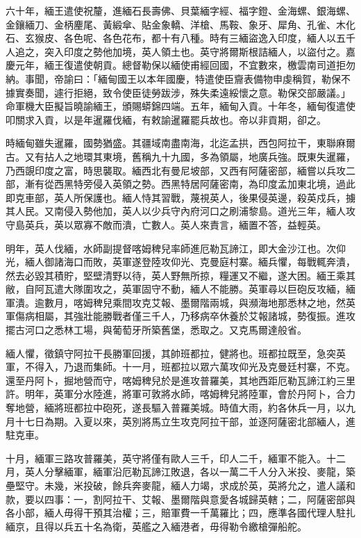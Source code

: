 \begin{pinyinscope}
六十年，緬王遣使祝釐，進緬石長壽佛、貝葉緬字經、福字鐙、金海螺、銀海螺、金鑲緬刀、金柄麈尾、黃緞傘、貼金象轎、洋槍、馬鞍、象牙、犀角、孔雀、木化石、玄猴皮、各色呢、各色花布，都十有八種。時有三緬盜逸入印度，緬人以五千人追之，突入印度之勢他加境，英人領土也。英守將爾斯根詰緬人，以盜付之。嘉慶元年，緬王復遣使朝貢。總督勒保以緬使甫經回國，不宜數來，檄雲南司道拒勿納。事聞，帝諭曰：「緬甸國王以本年國慶，特遣使臣齎表備物申虔稱賀，勒保不據實奏聞，遽行拒絕，致令使臣徒勞跋涉，殊失柔遠綏懷之意。勒保交部嚴議。」命軍機大臣擬旨曉諭緬王，頒賜蟒錦四端。五年，緬甸入貢。十年冬，緬甸復遣使叩關求入貢，以是年暹羅伐緬，有敕諭暹羅罷兵故也。帝以非貢期，卻之。

時緬甸雖失暹羅，國勢猶盛。其疆域南盡南海，北迄孟拱，西包阿拉干，東聯麻爾古。又有拈人之地環其東境，舊稱九十九國，多為領屬，地廣兵強。既東失暹羅，乃西覬印度之富，時思襲取。緬西北有曼尼坡部，又西有阿薩密部，緬嘗以兵攻二部，漸有從西黑特旁侵入英領之勢。西黑特居阿薩密南，為印度孟加東北境，過此即克車部，英人所保護也。緬人恃其習戰，蔑視英人，後果侵英邊，殺英戍兵，擄其人民。又南侵入勢他加，英人以少兵守內府河口之刷浦黎島。道光三年，緬人攻守島英兵，英以眾寡不敵而潰，亡數人。英人來責言，緬置不答，益輕英。

明年，英人伐緬，水師副提督喀姆稗兒率師進厄勒瓦諦江，即大金沙江也。次仰光，緬人御諸海口而敗，英軍遂登陸攻仰光、克曼庭村寨。緬兵懼，每戰輒奔潰，然去必毀其積貯，堅壁清野以待，英人野無所掠，糧運又不繼，遂大困。緬王乘其敝，自阿瓦遣大隊圍攻之，英軍固守不動，緬人不能勝。英軍尋以巨砲反攻緬，緬軍潰。逾數月，喀姆稗兒乘間攻克艾報、墨爾階兩城，與瀕海地那悉林之地，然英軍傷病相屬，其強壯能勝戰者僅三千人，乃移病卒休養於艾報諸城，勢復振。進攻擺古河口之悉林工場，與葡萄牙所築舊堡，悉取之。又克馬爾達般省。

緬人懼，徵鎮守阿拉干長勝軍回援，其帥班都拉，健將也。班都拉既至，急突英軍，不得入，乃退而集師。十一月，班都拉以眾六萬攻仰光及克曼廷村寨，不克。還至丹阿卜，掘地營而守，喀姆稗兒於是進攻普羅美，其地西距厄勒瓦諦江約三里許。明年，英軍分水陸進，將軍可敦將水師，喀姆稗兒將陸軍，會於丹阿卜，合力奪地營，緬將班都拉中砲死，遂長驅入普羅美城。時值大雨，約各休兵一月，以九月十七日為期。入夏以來，英別將馬立生攻克阿拉干部，並逐阿薩密北部緬人，進駐克車。

十月，緬軍三路攻普羅美，英守將僅有歐人三千，印人二千，緬軍不能入。十二月，英人分擊緬軍，緬軍沿厄勒瓦諦江敗退，各以一萬二千人分入米投、麥龍，築壘堅守。未幾，米投破，餘兵奔麥龍，緬人力竭，求成於英，英將允之，遣人議和款，要以四事：一，割阿拉干、艾報、墨爾階與意愛各城歸英轄；二，阿薩密部與各小部，緬人毋得干預其治權；三，賠軍費一千萬羅比；四，應準各國代理人駐扎緬京，且得以兵五十名為衛，英艦之入緬港者，毋得勒令繳槍彈船舵。


\end{pinyinscope}
